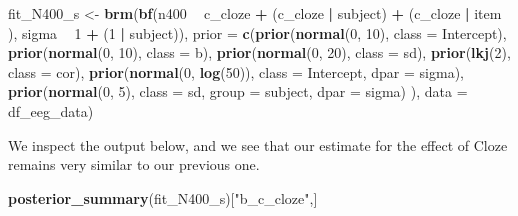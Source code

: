 \documentclass[12pt,]{krantz}
\newenvironment{Shaded}{\begin{snugshade}}{\end{snugshade}}
\newcommand{\KeywordTok}[1]{\textcolor[rgb]{0.13,0.29,0.53}{\textbf{#1}}}
\newcommand{\DataTypeTok}[1]{\textcolor[rgb]{0.13,0.29,0.53}{#1}}
\newcommand{\DecValTok}[1]{\textcolor[rgb]{0.00,0.00,0.81}{#1}}
\newcommand{\StringTok}[1]{\textcolor[rgb]{0.31,0.60,0.02}{#1}}
\newcommand{\OperatorTok}[1]{\textcolor[rgb]{0.81,0.36,0.00}{\textbf{#1}}}
\newcommand{\NormalTok}[1]{#1}
\theoremstyle{definition}
\theoremstyle{definition}
\theoremstyle{definition}
\theoremstyle{remark}
\begin{document}
\begin{Shaded}
\begin{Highlighting}[]
\NormalTok{fit_N400_s <-}\StringTok{ }\KeywordTok{brm}\NormalTok{(}\KeywordTok{bf}\NormalTok{(n400 }\OperatorTok{~}\StringTok{ }\NormalTok{c_cloze }\OperatorTok{+}\StringTok{ }\NormalTok{(c_cloze }\OperatorTok{|}\StringTok{ }\NormalTok{subject) }\OperatorTok{+}\StringTok{ }\NormalTok{(c_cloze }\OperatorTok{|}\StringTok{ }\NormalTok{item ),}
\NormalTok{                       sigma }\OperatorTok{~}\StringTok{ }\DecValTok{1} \OperatorTok{+}\StringTok{ }\NormalTok{(}\DecValTok{1} \OperatorTok{|}\StringTok{ }\NormalTok{subject)),}
                  \DataTypeTok{prior =}
                      \KeywordTok{c}\NormalTok{(}\KeywordTok{prior}\NormalTok{(}\KeywordTok{normal}\NormalTok{(}\DecValTok{0}\NormalTok{, }\DecValTok{10}\NormalTok{), }\DataTypeTok{class =}\NormalTok{ Intercept),}
                        \KeywordTok{prior}\NormalTok{(}\KeywordTok{normal}\NormalTok{(}\DecValTok{0}\NormalTok{, }\DecValTok{10}\NormalTok{), }\DataTypeTok{class =}\NormalTok{ b),}
                        \KeywordTok{prior}\NormalTok{(}\KeywordTok{normal}\NormalTok{(}\DecValTok{0}\NormalTok{, }\DecValTok{20}\NormalTok{), }\DataTypeTok{class =}\NormalTok{ sd),}
                        \KeywordTok{prior}\NormalTok{(}\KeywordTok{lkj}\NormalTok{(}\DecValTok{2}\NormalTok{), }\DataTypeTok{class =}\NormalTok{ cor),}
                        \KeywordTok{prior}\NormalTok{(}\KeywordTok{normal}\NormalTok{(}\DecValTok{0}\NormalTok{, }\KeywordTok{log}\NormalTok{(}\DecValTok{50}\NormalTok{)), }\DataTypeTok{class =}\NormalTok{ Intercept, }\DataTypeTok{dpar =}\NormalTok{ sigma),}
                        \KeywordTok{prior}\NormalTok{(}\KeywordTok{normal}\NormalTok{(}\DecValTok{0}\NormalTok{, }\DecValTok{5}\NormalTok{), }\DataTypeTok{class =}\NormalTok{ sd, }\DataTypeTok{group =}\NormalTok{ subject, }
                              \DataTypeTok{dpar =}\NormalTok{ sigma)}
\NormalTok{                        ),}
                  \DataTypeTok{data =}\NormalTok{ df_eeg_data)}
\end{Highlighting}
\end{Shaded}

We inspect the output below, and we see that our estimate for the effect
of Cloze remains very similar to our previous one.

\begin{Shaded}
\begin{Highlighting}[]
\KeywordTok{posterior_summary}\NormalTok{(fit_N400_s)[}\StringTok{"b_c_cloze"}\NormalTok{,]}
\end{Highlighting}
\end{Shaded}
\end{document}
